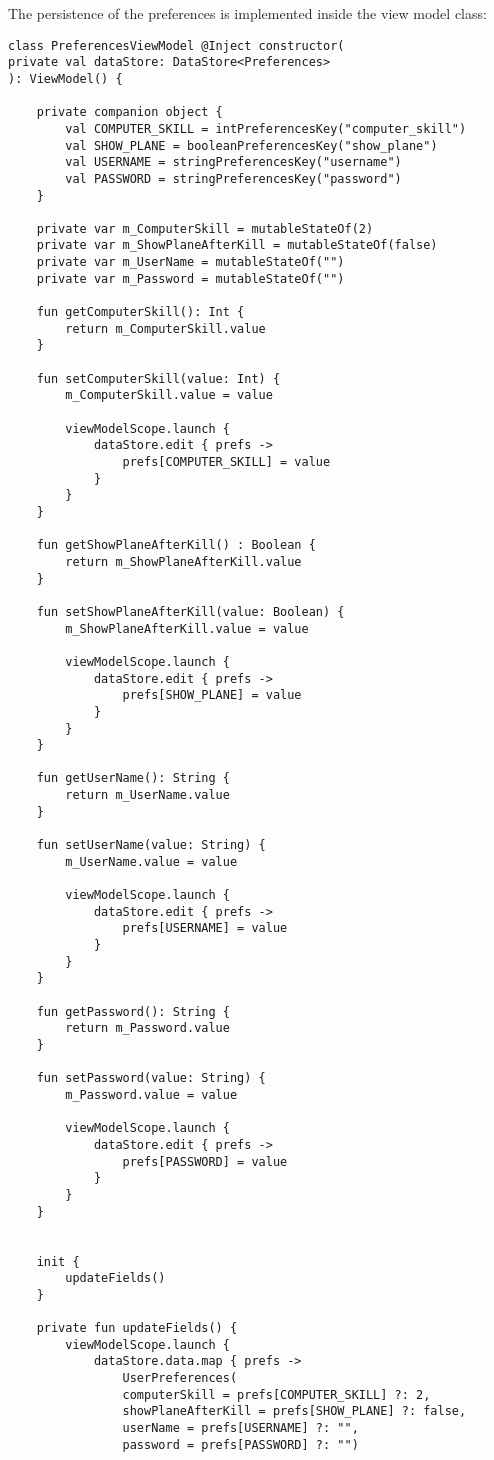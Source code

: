 The persistence of the preferences is implemented inside the view model class:

\begin{lstlisting}
class PreferencesViewModel @Inject constructor(
private val dataStore: DataStore<Preferences>
): ViewModel() {
	
	private companion object {
		val COMPUTER_SKILL = intPreferencesKey("computer_skill")
		val SHOW_PLANE = booleanPreferencesKey("show_plane")
		val USERNAME = stringPreferencesKey("username")
		val PASSWORD = stringPreferencesKey("password")
	}
	
	private var m_ComputerSkill = mutableStateOf(2)
	private var m_ShowPlaneAfterKill = mutableStateOf(false)
	private var m_UserName = mutableStateOf("")
	private var m_Password = mutableStateOf("")
	
	fun getComputerSkill(): Int {
		return m_ComputerSkill.value
	}
	
	fun setComputerSkill(value: Int) {
		m_ComputerSkill.value = value
		
		viewModelScope.launch {
			dataStore.edit { prefs ->
				prefs[COMPUTER_SKILL] = value
			}
		}
	}
	
	fun getShowPlaneAfterKill() : Boolean {
		return m_ShowPlaneAfterKill.value
	}
	
	fun setShowPlaneAfterKill(value: Boolean) {
		m_ShowPlaneAfterKill.value = value
		
		viewModelScope.launch {
			dataStore.edit { prefs ->
				prefs[SHOW_PLANE] = value
			}
		}
	}
	
	fun getUserName(): String {
		return m_UserName.value
	}
	
	fun setUserName(value: String) {
		m_UserName.value = value
		
		viewModelScope.launch {
			dataStore.edit { prefs ->
				prefs[USERNAME] = value
			}
		}
	}
	
	fun getPassword(): String {
		return m_Password.value
	}
	
	fun setPassword(value: String) {
		m_Password.value = value
		
		viewModelScope.launch {
			dataStore.edit { prefs ->
				prefs[PASSWORD] = value
			}
		}
	}
	
	
	init {
		updateFields()
	}
	
	private fun updateFields() {
		viewModelScope.launch {
			dataStore.data.map { prefs ->
				UserPreferences(
				computerSkill = prefs[COMPUTER_SKILL] ?: 2,
				showPlaneAfterKill = prefs[SHOW_PLANE] ?: false,
				userName = prefs[USERNAME] ?: "",
				password = prefs[PASSWORD] ?: "")
				

\end{lstlisting}
